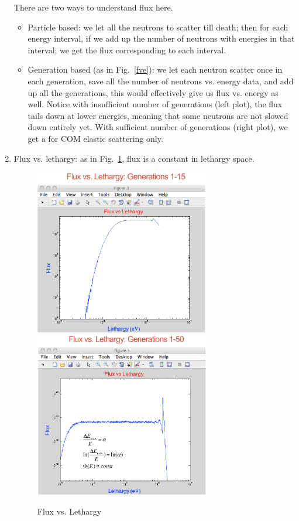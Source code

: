 \documentclass{school-22.211-notes}
\begin{document}
\begin{enumerate}
There are two ways to understand flux here. 
\begin{itemize}
\item Particle based: we let all the neutrons to scatter till death; then for each energy interval, if we add up the number of neutrons with energies in that interval; we get the flux corresponding to each interval.  
\item Generation based (as in Fig.~\ref{fve}): we let each neutron scatter once in each generation, save all the number of neutrons vs. energy data, and add up all the generations, this would effectively give us flux vs. energy as well. Notice with insufficient number of generations (left plot), the flux tails down at lower energies, meaning that some neutrons are not slowed down entirely yet. With sufficient number of generations (right plot), we get a  for COM elastic scattering only. 
\end{itemize}

\item Flux vs. lethargy: as in Fig.~\ref{fvl}, flux is a constant in lethargy space. 
\begin{figure}[ht]
  \centering
  \includegraphics[width=3in]{images/sl-d/flux-vs-lethargy-1.png}
  \includegraphics[width=3in]{images/sl-d/flux-vs-lethargy-2.png}
  \caption{Flux vs. Lethargy} \label{fvl}
\end{figure}




\end{enumerate}
\end{document}
